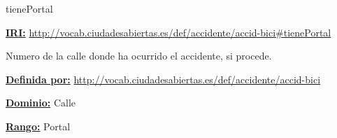 \begin{mybox}{tienePortal}
\begin{flushleft}
\underline{\textbf{IRI:}}
\url{http://vocab.ciudadesabiertas.es/def/accidente/accid-bici#tienePortal}
\newline

Numero de la calle donde ha ocurrido el accidente, si procede.
\newline

\underline{\textbf{Definida por:}}
\url{http://vocab.ciudadesabiertas.es/def/accidente/accid-bici}
\newline

\underline{\textbf{Dominio:}} 
	Calle
\newline

\underline{\textbf{Rango:}} 
	Portal
\newline

\end{flushleft}
\end{mybox}




































